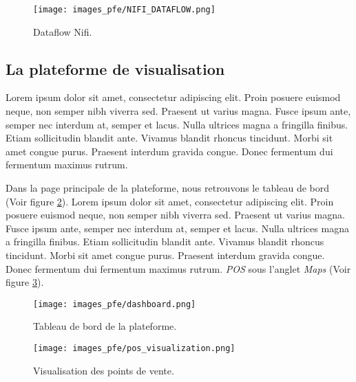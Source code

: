 \begin{figure}[hbt!]
  \centering
  \texttt{[image: images\_pfe/NIFI\_DATAFLOW.png]}
  \caption{Dataflow Nifi.}
  \label{fig:nifi-dataflow}
\end{figure}
\FloatBarrier

\subsection{La plateforme de visualisation}
Lorem ipsum dolor sit amet, consectetur adipiscing elit. Proin posuere euismod neque, non semper nibh viverra sed. Praesent ut varius magna. Fusce ipsum ante, semper nec interdum at, semper et lacus. Nulla ultrices magna a fringilla finibus. Etiam sollicitudin blandit ante. Vivamus blandit rhoncus tincidunt. Morbi sit amet congue purus. Praesent interdum gravida congue. Donec fermentum dui fermentum maximus rutrum.

\medskip

Dans la page principale de la plateforme, nous retrouvons le tableau de bord (Voir figure \ref{fig:dashboard-page}). Lorem ipsum dolor sit amet, consectetur adipiscing elit. Proin posuere euismod neque, non semper nibh viverra sed. Praesent ut varius magna. Fusce ipsum ante, semper nec interdum at, semper et lacus. Nulla ultrices magna a fringilla finibus. Etiam sollicitudin blandit ante. Vivamus blandit rhoncus tincidunt. Morbi sit amet congue purus. Praesent interdum gravida congue. Donec fermentum dui fermentum maximus rutrum. \textit{POS} sous l'anglet \textit{Maps} (Voir figure \ref{fig:pos-page}). 

\medskip



\begin{figure}[hbt!]
  \centering
  \texttt{[image: images\_pfe/dashboard.png]}
  \caption{Tableau de bord de la plateforme.}
  \label{fig:dashboard-page}
\end{figure}
\FloatBarrier

\begin{figure}[hbt!]
  \centering
  \texttt{[image: images\_pfe/pos\_visualization.png]}
  \caption{Visualisation des points de vente.}
  \label{fig:pos-page}
\end{figure}
\FloatBarrier

